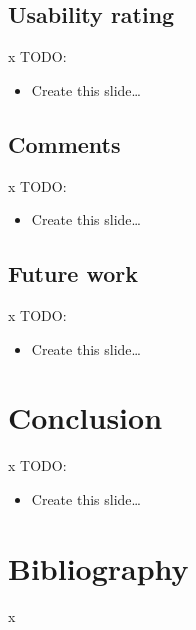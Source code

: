 \documentclass{beamer}
\newlength{\wideitemsep}
\let\olditem\item
\renewcommand{\item}{\setlength{\itemsep}{\wideitemsep}\olditem}
\begin{document}
\subsection{Usability rating}
\begin{frame}{x}{}
TODO:
\begin{itemize}
\item Create this slide\ldots
\end{itemize}
\end{frame}


\subsection{Comments}
\begin{frame}{x}{}
TODO:
\begin{itemize}
\item Create this slide\ldots
\end{itemize}
\end{frame}


\subsection{Future work}
\begin{frame}{x}{}
TODO:
\begin{itemize}
\item Create this slide\ldots
\end{itemize}
\end{frame}



\section{Conclusion}
\begin{frame}{x}{}
TODO:
\begin{itemize}
\item Create this slide\ldots
\end{itemize}
\end{frame}



\section*{Bibliography}
\begin{frame}[allowframebreaks]{x}{}
\nocite{all, the, things}

\tiny{}
\end{frame}
\end{document}
